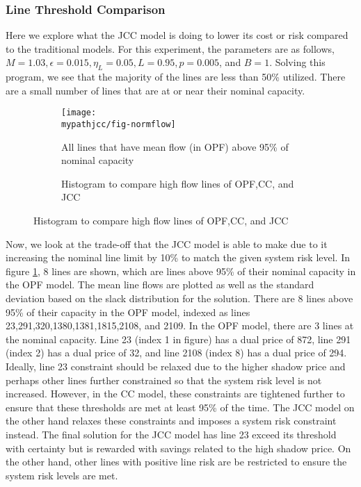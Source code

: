 \subsubsection*{Line Threshold Comparison}
Here we explore what the JCC model is doing to lower its cost or risk compared to the traditional models.  For this experiment, the parameters are as follows, $M=1.03, \epsilon=0.015, \eta_L=0.05, L=0.95, p=0.005$, and $B=1$.  Solving this program, we see that the majority of the lines are less than 50\% utilized.  There are a small number of lines that are at or near their nominal capacity.


\begin{figure}
\centering
\begin{subfigure}[b]{0.4\textwidth}
\texttt{[image: \\mypathjcc/fig-normflow]}
\caption{All lines that have mean flow (in OPF) above 95\% of nominal capacity}\label{solve_shadow}
\end{subfigure}
\hspace{15px}
\begin{subfigure}[b]{0.4\textwidth}
\centering

\caption{Histogram to compare high flow lines of OPF,CC, and JCC}\label{histogram}
\end{subfigure}
\end{figure}

Now, we look at the trade-off that the JCC model is able to make due to it increasing the nominal line limit by 10\% to match the given system risk level.  In figure \ref{solve_shadow}, 8 lines are shown, which are lines above 95\% of their nominal capacity in the OPF model.  The mean line flows are plotted as well as the standard deviation based on the slack distribution for the solution.   There are 8 lines above 95\% of their capacity in the OPF model, indexed as lines 23,291,320,1380,1381,1815,2108, and 2109. In the OPF model, there are 3 lines at the nominal capacity.  Line 23 (index 1 in figure) has a dual price of 872, line 291 (index 2) has a dual price of 32, and line 2108 (index 8) has a dual price of 294.  Ideally, line 23 constraint should be relaxed due to the higher shadow price and perhaps other lines further constrained so that the system risk level is not increased. However, in the CC model, these constraints are tightened further to ensure that these thresholds are met at least 95\% of the time.  The JCC model on the other hand relaxes these constraints and imposes a system risk constraint instead.  The final solution for the JCC model has line 23 exceed its threshold with certainty but is rewarded with savings related to the high shadow price.  On the other hand, other lines with positive line risk are be restricted to ensure the system risk levels are met.

